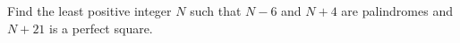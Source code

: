 Find the least positive integer $N$ such that $N-6$ and $N+4$ are palindromes and $N+21$ is a perfect square.
